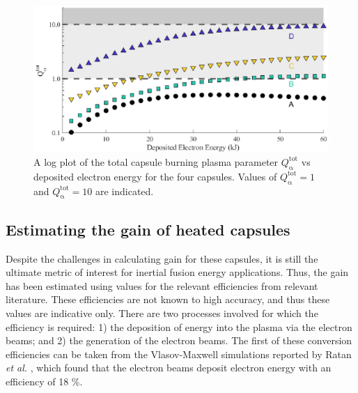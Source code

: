 \begin{figure}[ht]
\centering
\includegraphics{figures/FurtherSims/QHeatingPlot.eps}
\caption{A log plot of the total capsule burning plasma parameter $Q^\mathrm{{tot}}_{\mathrm{\alpha}}$ vs deposited electron energy for the four capsules. Values of $Q^\mathrm{{tot}}_{\mathrm{\alpha}} = 1$ and $Q^\mathrm{{tot}}_{\mathrm{\alpha}} = 10$ are indicated.}
\label{fig:HeatedQ}
\end{figure}

\subsection{Estimating the gain of heated capsules}

Despite the challenges in calculating gain for these capsules, it is still the ultimate metric of interest for inertial fusion energy applications. Thus, the gain has been estimated using values for the relevant efficiencies from relevant literature. These efficiencies are not known to high accuracy, and thus these values are indicative only. There are two processes involved for which the efficiency is required: 1) the deposition of energy into the plasma via the electron beams; and 2) the generation of the electron beams. The first of these conversion efficiencies can be taken from the Vlasov-Maxwell simulations reported by Ratan \textit{et al.} \cite{Ratan2017}, which found that the electron beams deposit electron energy with an efficiency of 18 \%.

